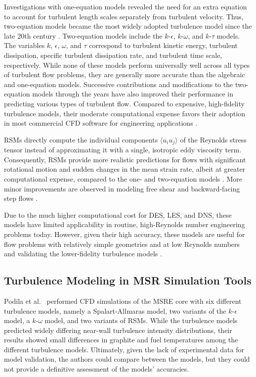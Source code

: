 Investigations with
one-equation models revealed the need for an extra equation to account for
turbulent length scales separately from turbulent velocity. Thus, two-equation
models became the most widely adopted turbulence model since the late 20th century
\cite{pope_turbulent_2000}. Two-equation models include the $k$-$\epsilon$,
$k$-$\omega$, and $k$-$\tau$ models. The variables $k$, $\epsilon$, $\omega$,
and $\tau$ correspond to turbulent kinetic energy, turbulent dissipation,
specific turbulent dissipation rate, and turbulent time scale, respectively.
While none of these models perform universally well across all types of
turbulent flow problems, they are generally more
accurate than the algebraic and one-equation models. Successive contributions
and modifications to the two-equation models through the years have also
improved their performance in predicting various types of turbulent flow. Compared to expensive,
high-fidelity turbulence models, their moderate computational expense favors their adoption in most
commercial \gls{CFD} software for engineering applications \cite{pope_turbulent_2000}.

\glspl{RSM} directly compute the individual components $\langle u_i u_j
\rangle$ of the Reynolds stress tensor instead of approximating it with a
single, isotropic eddy viscosity term. Consequently, \glspl{RSM} provide
more realistic predictions for flows with significant rotational motion and
sudden changes in the mean strain rate, albeit at greater computational
expense, compared to the one- and two-equation models
\cite{wilcox_turbulence_2006}. More minor improvements are observed in modeling
free shear and backward-facing step flows \cite{wilcox_turbulence_2006}.

Due to the much higher computational cost for \gls{DES}, \gls{LES}, and
\gls{DNS}, these models have limited applicability in routine, high-Reynolds
number engineering problems today. However, given their high accuracy, these
models are useful for flow problems with relatively simple geometries and at
low Reynolds numbers and validating the lower-fidelity turbulence models
\cite{zhiyin_large-eddy_2015}.

\subsection{Turbulence Modeling in MSR Simulation Tools}

Podila et al.\ \cite{podila_cfd_2019} performed \gls{CFD} simulations of the
\gls{MSRE} core with six different turbulence models, namely a Spalart-Allmaras
model, two variants of the $k$-$\epsilon$ model, a $k$-$\omega$ model, and two
variants of \glspl{RSM}. While the turbulence models predicted widely differing near-wall
turbulence intensity distributions, their results showed small differences
in graphite and fuel temperatures among the different turbulence models. Ultimately, given
the lack of experimental data for model validation, the authors could compare between the
models, but they could not provide a definitive
assessment of the models' accuracies.

